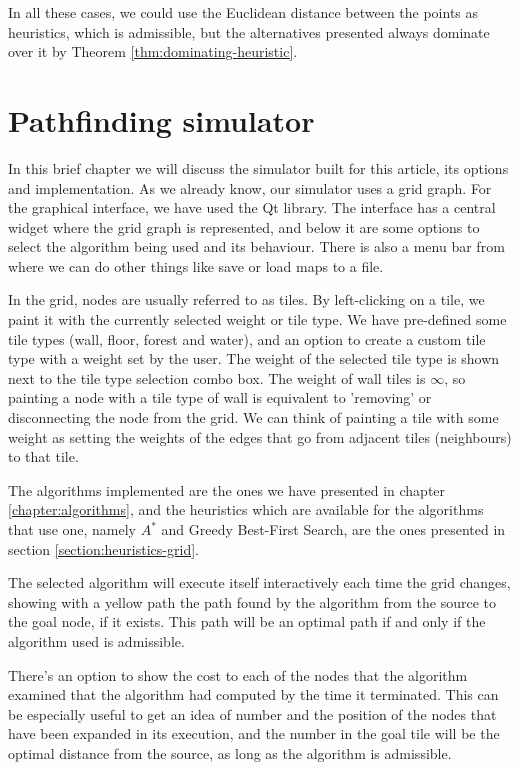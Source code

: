 \documentclass[12pt]{report}
\begin{document}
In all these cases, we could use the Euclidean distance between the points as heuristics, which is admissible, but the alternatives presented always dominate over it by Theorem \ref{thm:dominating-heuristic}.


\chapter{Pathfinding simulator}

In this brief chapter we will discuss the simulator built for this article, its options and implementation. As we already know, our simulator uses a grid graph. For the graphical interface, we have used the Qt library. The interface has a central widget where the grid graph is represented, and below it are some options to select the algorithm being used and its behaviour. There is also a menu bar from where we can do other things like save or load maps to a file.

In the grid, nodes are usually referred to as tiles. By left-clicking on a tile, we paint it with the currently selected weight or tile type. We have pre-defined some tile types (wall, floor, forest and water), and an option to create a custom tile type with a weight set by the user. The weight of the selected tile type is shown next to the tile type selection combo box. The weight of wall tiles is $\infty$, so painting a node with a tile type of wall is equivalent to 'removing' or disconnecting the node from the grid. We can think of painting a tile with some weight as setting the weights of the edges that go from adjacent tiles (neighbours) to that tile.

The algorithms implemented are the ones we have presented in chapter \ref{chapter:algorithms}, and the heuristics which are available for the algorithms that use one, namely $A^*$ and Greedy Best-First Search, are the ones presented in section \ref{section:heuristics-grid}.

The selected algorithm will execute itself interactively each time the grid changes, showing with a yellow path the path found by the algorithm from the source to the goal node, if it exists. This path will be an optimal path if and only if the algorithm used is admissible.

There's an option to show the cost to each of the nodes that the algorithm examined that the algorithm had computed by the time it terminated. This can be especially useful to get an idea of number and the position of the nodes that have been expanded in its execution, and the number in the goal tile will be the optimal distance from the source, as long as the algorithm is admissible.
\end{document}
